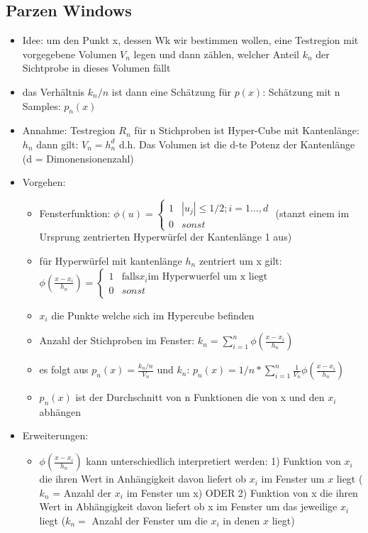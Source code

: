 \documentclass{article} %
\begin{document}
	\subsection{Parzen Windows}
	\begin{itemize}
		\item Idee: um den Punkt x, dessen Wk wir bestimmen wollen, eine Testregion mit vorgegebene Volumen $V_n$ legen und dann zählen, welcher Anteil $k_n$ der Sichtprobe in dieses Volumen fällt
		\item das Verhältnis $k_n/n$ ist dann eine Schätzung für $p(x)$: Schätzung mit n Samples: $p_n(x)$
		\item Annahme: Testregion $R_n$ für n Stichproben ist Hyper-Cube mit Kantenlänge: $h_n$ dann gilt: $V_n = h_n^d$ d.h. Das Volumen ist die d-te Potenz der Kantenlänge (d = Dimonensionenzahl)
		\item Vorgehen:
		\begin{itemize}
			\item Fensterfunktion: $\phi(u) = \begin{cases}
			1 & |u_j| \leq 1/2; i = 1\dots,d\\
			0 & sonst
			\end{cases}$ (stanzt einem im Ursprung zentrierten Hyperwürfel der Kantenlänge 1 aus)
			\item für Hyperwürfel mit kantenlänge $h_n$ zentriert um x gilt: $\phi(\frac{x-x_i}{h_n}) = \begin{cases}
			1 & \text{falls} x_i \text{im Hyperwuerfel um x liegt}\\
			0 & sonst
			\end{cases}$
			\item $x_i$ die Punkte welche sich im Hypercube befinden
			\item Anzahl der Stichproben im Fenster: $k_n = \sum_{i=1}^{n}\phi(\frac{x-x_i}{h_n})$
			\item es folgt aus $p_n(x) = \frac{k_n/n}{V_n}$ und $k_n$: $p_n(x) = 1/n * \sum_{i=1}^{n} \frac{1}{V_n}\phi(\frac{x-x_i}{h_n})$
			\item $p_n(x)$ ist der Durchschnitt von n Funktionen die von x und den $x_i$ abhängen
		\end{itemize}
		\item Erweiterungen:
		\begin{itemize}
			\item $\phi(\frac{x-x_i}{h_n})$ kann unterschiedlich interpretiert werden: 1) Funktion von $x_i$ die ihren Wert in Anhängigkeit davon liefert ob $x_i$ im Fenster um $x$ liegt ($k_n$ = Anzahl der $x_i$ im Fenster um x) ODER 2) Funktion von x die ihren Wert in Abhängigkeit davon liefert ob x im Fenster um das jeweilige $x_i$ liegt ($k_n =$ Anzahl der Fenster um die $x_i$ in denen $x$ liegt)

\end{itemize}
\end{itemize}
\end{document}

